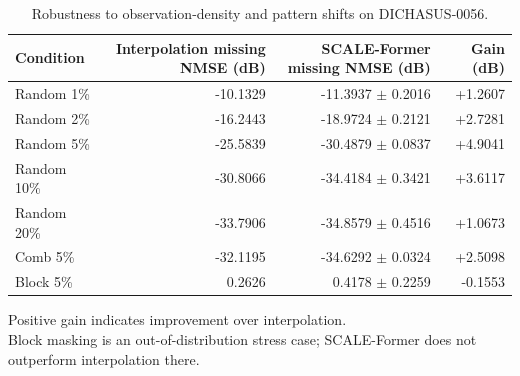 \begin{table}[t]
\centering
\caption{Robustness to observation-density and pattern shifts on DICHASUS-0056.}
\label{tab:robustness}
\begin{tabular}{lrrr}
\hline
Condition & Interpolation missing NMSE (dB) & SCALE-Former missing NMSE (dB) & Gain (dB) \\
\hline
Random 1\% & -10.1329 & -11.3937 $\pm$ 0.2016 & +1.2607 \\
Random 2\% & -16.2443 & -18.9724 $\pm$ 0.2121 & +2.7281 \\
Random 5\% & -25.5839 & -30.4879 $\pm$ 0.0837 & +4.9041 \\
Random 10\% & -30.8066 & -34.4184 $\pm$ 0.3421 & +3.6117 \\
Random 20\% & -33.7906 & -34.8579 $\pm$ 0.4516 & +1.0673 \\
Comb 5\% & -32.1195 & -34.6292 $\pm$ 0.0324 & +2.5098 \\
Block 5\% & 0.2626 & 0.4178 $\pm$ 0.2259 & -0.1553 \\
\hline
\end{tabular}
\vspace{1mm}
\begin{minipage}{0.98\textwidth}
\footnotesize
Positive gain indicates improvement over interpolation.\\
Block masking is an out-of-distribution stress case; SCALE-Former does not outperform interpolation there.\\
\end{minipage}
\end{table}
